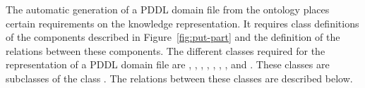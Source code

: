 The automatic generation of a PDDL domain file from the ontology places
certain requirements on the knowledge representation.
It requires class 
definitions of the components described in Figure~\ref{fig:put-part} and the 
definition of the relations between these components. The different classes 
required for the representation of a PDDL domain file are , 
, , , , 
, , and . These 
classes are subclasses of the class . The relations between 
these classes are described below.

